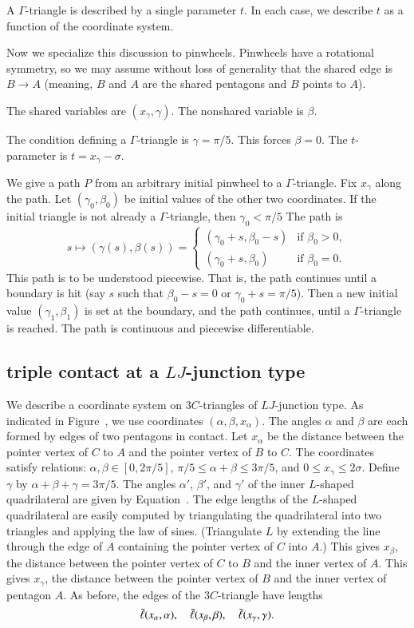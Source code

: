 A $\Gamma$-triangle is described by a single parameter $t$.  In each
case, we describe $t$ as a function of the coordinate system.

Now we specialize this discussion to pinwheels.  Pinwheels have a
rotational symmetry, so we may assume without loss of generality that
the shared edge is $B\to A$ (meaning, $B$ and $A$ are the shared
pentagons and $B$ points to $A$).

The shared variables are $(x_\gamma,\gamma)$.  The nonshared variable
is $\beta$.

The condition defining a $\Gamma$-triangle is $\gamma=\pi/5$.  This
forces $\beta=0$. The $t$-parameter is $t =x_\gamma - \sigma$.

We give a path $P$ from an arbitrary initial pinwheel to a
$\Gamma$-triangle.  Fix $x_\gamma$ along the path.  Let
$(\gamma_0,\beta_0)$ be initial values of the other two coordinates.
If the initial triangle is not already a $\Gamma$-triangle, then
$\gamma_0 < \pi/5$ The path is
\[
s\mapsto (\gamma(s),\beta(s)) = 
\begin{cases}
(\gamma_0+s,\beta_0-s) & \text{if } \beta_0 > 0,\\
(\gamma_0+s,\beta_0) & \text{if } \beta_0 = 0.
\end{cases}
\]
This path is to be understood piecewise.  That is, the path continues
until a boundary is hit (say $s$ such that $\beta_0-s = 0$ or
$\gamma_0+s=\pi/5$).  Then a new initial value $(\gamma_1,\beta_1)$ is
set at the boundary, and the path continues, until a $\Gamma$-triangle
is reached.  The path is continuous and piecewise differentiable.

\subsection{triple contact at a $LJ$-junction type}

We describe a coordinate system on $3C$-triangles of $LJ$-junction
type.  As indicated in Figure~, we use coordinates
$(\alpha,\beta,x_\alpha)$.  The angles $\alpha$ and $\beta$ are each
formed by edges of two pentagons in contact.  Let $x_\alpha$ be the
distance between the pointer vertex of $C$ to $A$ and the pointer
vertex of $B$ to $C$.  The coordinates satisfy relations:
$\alpha,\beta\in [0,2\pi/5]$, $\pi/5\le\alpha+\beta\le 3\pi/5$, and
$0\le x_\gamma\le 2\sigma$.  Define $\gamma$ by
$\alpha+\beta+\gamma=3\pi/5$.  The angles $\alpha'$, $\beta'$, and
$\gamma'$ of the inner $L$-shaped quadrilateral are given by
Equation~.  The edge lengths of the $L$-shaped
quadrilateral are easily computed by triangulating the quadrilateral
into two triangles and applying the law of sines.  (Triangulate
$L$ by extending the line through the edge of $A$ containing the
pointer vertex of $C$ into $A$.)  This gives
$x_\beta$, the distance between the pointer vertex of $C$ to $B$ and
the inner vertex of $A$.  This gives $x_\gamma$, the distance between
the pointer vertex of $B$ and the inner vertex of pentagon $A$.
As before, the edges of the $3C$-triangle have lengths
\[
\bar\ell(x_\alpha,\alpha),\quad \bar\ell(x_\beta,\beta),\quad \bar\ell(x_\gamma,\gamma).
\]

